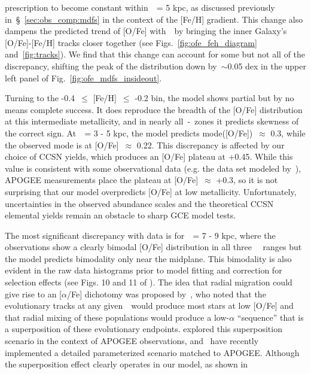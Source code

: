 \documentclass[draft2.tex]{subfiles}
\begin{document}
prescription to become constant within~\rgal~= 5 kpc, as discussed previously 
in~\S~\ref{sec:obs_comp:mdfs} in the context of the [Fe/H] gradient. 
This change also dampens the predicted trend of [O/Fe] with~\absz~by bringing 
the inner Galaxy's [O/Fe]-[Fe/H] tracks closer together (see 
Figs.~\ref{fig:ofe_feh_diagram} and~\ref{fig:tracks}). 
We find that this change can account for some but not all of the discrepancy, 
shifting the peak of the distribution down by~$\sim$0.05 dex in the upper left 
panel of Fig.~\ref{fig:ofe_mdfs_insideout}. 
\par 
Turning to the -0.4~$\leq$ [Fe/H]~$\leq$ -0.2 bin, the model shows partial but 
by no means complete success. 
It does reproduce the breadth of the [O/Fe] distribution at this intermediate 
metallicity, and in nearly all~\rgal-\absz~zones it predicts skewness of the 
correct sign. 
At~\rgal~= 3 - 5 kpc, the model predicts mode([O/Fe])~$\approx$ 0.3, while 
the observed mode is at [O/Fe]~$\approx$ 0.22. 
This discrepancy is affected by our choice of CCSN yields, which produces an 
[O/Fe] plateau at +0.45. 
While this value is consistent with some observational data (e.g. the 
\citealp*{Ramirez2013} data set modeled by~\citealp{Andrews2017}), APOGEE 
measurements place the plateau at [O/Fe]~$\approx$ +0.3, so it is not 
surprising that our model overpredicts [O/Fe] at low metallicity. 
Unfortunately, uncertainties in the observed abundance scales and the 
theoretical CCSN elemental yields remain an obstacle to sharp GCE model tests. 
\par 
The most significant discrepancy with data is for~\rgal~= 7 - 9 kpc, where the 
observations show a clearly bimodal [O/Fe] distribution in all three~\absz~ 
ranges but the model predicts bimodality only near the midplane. 
This bimodality is also evident in the raw data histograms prior to model 
fitting and correction for selection effects (see Figs. 10 and 11 of 
\citealp{Vincenzo2021a}). 
The idea that radial migration could give rise to an [$\alpha$/Fe] dichotomy 
was proposed by~\citet{Schoenrich2009a}, who noted that the evolutionary tracks 
at any given~\rgal~would produce most stars at low [O/Fe] and that radial 
mixing of these populations would produce a low-$\alpha$ ``sequence'' that is 
a superposition of these evolutionary endpoints. 
\citet{Nidever2014} explored this superposition scenario in the context of 
APOGEE observations, and~\citet{Sharma2020} have recently implemented a 
detailed parameterized scenario matched to APOGEE. 
Although the superposition effect clearly operates in our model, as shown in 
\end{document}
